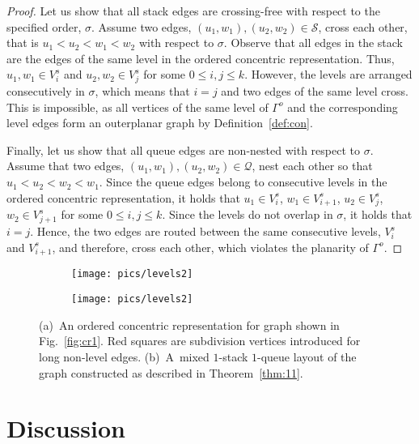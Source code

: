 \documentclass[orivec]{llncs}
\newcommand{\Sh}{{\ensuremath{\mathcal{S}}}}
\newcommand{\Qh}{{\ensuremath{\mathcal{Q}}}}
\begin{document}
\begin{proof}
    Let us show that all stack edges are crossing-free with respect to the specified order, $\sigma$.
    Assume two edges, $(u_1, w_1), (u_2, w_2) \in \Sh$, cross each other, that is
    $u_1 < u_2 < w_1 < w_2$ with respect to $\sigma$.
    Observe that all edges in the stack are the edges of the same level in the ordered concentric representation.
    Thus, $u_1, w_1 \in V_i^s$ and $u_2, w_2 \in V_j^s$ for some $0 \le i, j \le k$. However, the levels
    are arranged consecutively in $\sigma$, which means that $i=j$ and two edges of the same level cross. This is impossible, as
    all vertices of the same level of $\Gamma^o$ and the corresponding level edges form an outerplanar graph by Definition~\ref{def:con}.
    
    Finally, let us show that all queue edges are non-nested with respect to $\sigma$. 
    Assume that two edges, $(u_1, w_1), (u_2, w_2) \in \Qh$, nest each other so that
    $u_1 < u_2 < w_2 < w_1$. Since the queue edges belong to consecutive levels in the ordered concentric representation,
    it holds that $u_1 \in V_i^s$, $w_1 \in V_{i+1}^s$, $u_2 \in V_j^s$, $w_2 \in V_{j+1}^s$ for some
    $0 \le i, j \le k$. Since the levels do not overlap in $\sigma$, it holds that $i = j$.
    Hence, the two edges are routed between the same consecutive levels, $V_i^s$ and $V_{i+1}^s$, and therefore, cross
    each other, which violates the planarity of $\Gamma^o$.
\end{proof}    

\begin{figure}[t]
    \centering
    \begin{subfigure}[b]{.495\linewidth}
        \texttt{[image: pics/levels2]}
        \caption{}
        \label{fig:pr1}
    \end{subfigure}
    \begin{subfigure}[b]{.495\linewidth}
        \texttt{[image: pics/levels2]}
        \caption{}
        \label{fig:pr2}
    \end{subfigure}
    \caption{(a)~An ordered concentric representation for graph shown
        in Fig.~\ref{fig:cr1}. Red squares are subdivision vertices introduced for long non-level edges.
        (b)~A~mixed $1$-stack $1$-queue layout of the graph constructed as described in Theorem~\ref{thm:11}.}
    \label{fig:pr}
\end{figure}


\section{Discussion}
\label{sect:disc}
\end{document}

